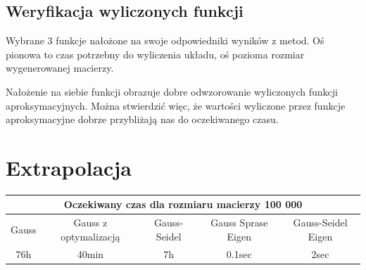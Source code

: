 \documentclass[8pt]{article}
\begin{document}
\subsection*{Weryfikacja wyliczonych funkcji}
Wybrane 3 funkcje nałożone na swoje odpowiedniki wyników z metod. Oś pionowa to czas potrzebny do wyliczenia układu, oś pozioma rozmiar wygenerowanej macierzy.


\begin{center}
\end{center}

Nałożenie na siebie funkcji obrazuje dobre odwzorowanie wyliczonych funkcji aproksymacyjnych. Można stwierdzić więc, że wartości wyliczone przez funkcje aproksymacyjne dobrze przybliżają nas do oczekiwanego czasu.

\section*{Extrapolacja}
\begin{center}
\begin{tabular}{ | c | c | c | c | c | }
  \hline
  \multicolumn{5}{|c|}{\textbf{Oczekiwany czas dla rozmiaru macierzy 100 000}} \\
  \hline
  Gauss & Gauss z optymalizacją & Gauss-Seidel &Gauss Sprase Eigen &Gauss-Seidel Eigen \\\hline
  76h & 40min & 7h &0.1sec &2sec \\\hline
  
  \hline
\end{tabular}

\end{center}
\end{document}
